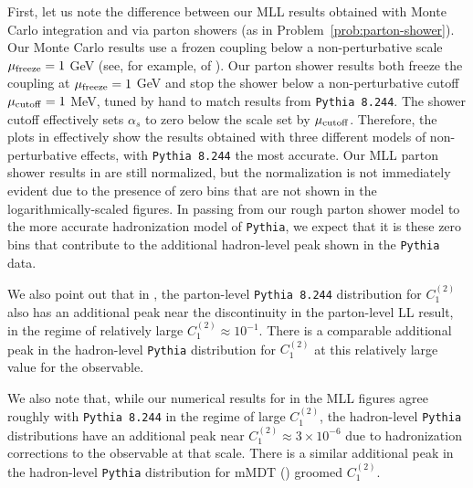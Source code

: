 First, let us note the difference between our MLL results obtained with Monte Carlo integration and via parton showers (as in Problem~\ref{prob:parton-shower}).
%
Our Monte Carlo results use a frozen coupling below a non-perturbative scale \(\mu_{\rm freeze} = 1\) GeV (see, for example,  of ).
%
Our parton shower results both freeze the coupling at \(\mu_{\rm freeze} = 1\) GeV and stop the shower below a non-perturbative cutoff \(\mu_{\rm cutoff} = 1\) MeV, tuned by hand to match results from \texttt{Pythia 8.244}.
%
The shower cutoff effectively sets \(\alpha_s\) to zero below the scale set by \(\mu_{\rm cutoff}\).
%
Therefore, the plots in  effectively show the results obtained with three different models of non-perturbative effects, with \texttt{Pythia 8.244} the most accurate.
%
Our MLL parton shower results in  are still normalized, but the normalization is not immediately evident due to the presence of zero bins that are not shown in the logarithmically-scaled figures.
%
In passing from our rough parton shower model to the more accurate \gls{hadronization} model of \texttt{Pythia}, we expect that it is these zero bins that contribute to the additional hadron-level peak shown in the \texttt{Pythia} data.

We also point out that in , the parton-level \texttt{Pythia 8.244} distribution for \(C_1^{(2)}\) also has an additional peak near the discontinuity in the parton-level LL result, in the regime of relatively large \(C_1^{(2)} \approx 10^{-1}\).
%
There is a comparable additional peak in the hadron-level \texttt{Pythia} distribution for \(C_1^{(2)}\) at this relatively large value for the observable.

We also note that, while our numerical results for  in the MLL figures agree roughly with \texttt{Pythia 8.244} in the regime of large \(C_1^{(2)}\), the hadron-level \texttt{Pythia} distributions have an additional peak near \(C_1^{(2)} \approx 3\times 10^{-6}\) due to \gls{hadronization} corrections to the observable at that scale.
%
There is a similar additional peak in the hadron-level \texttt{Pythia} distribution for mMDT () groomed \(C_1^{(2)}\).


